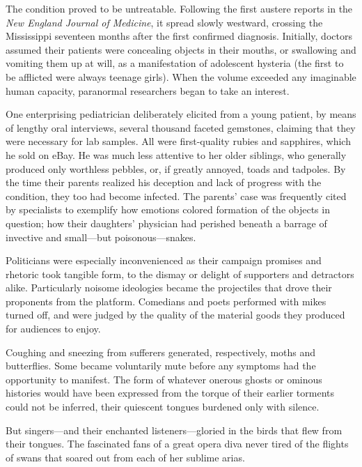 
The condition proved to be untreatable. Following the first austere
reports in the \emph{New England Journal of Medicine}, it spread slowly
westward, crossing the Mississippi seventeen months after the first
confirmed diagnosis. Initially, doctors assumed their patients were
concealing objects in their mouths, or swallowing and vomiting them up
at will, as a manifestation of adolescent hysteria (the first to be
afflicted were always teenage girls). When the volume exceeded any
imaginable human capacity, paranormal researchers began to take an
interest.

One enterprising pediatrician deliberately elicited from a young
patient, by means of lengthy oral interviews, several thousand faceted
gemstones, claiming that they were necessary for lab samples. All were
first-quality rubies and sapphires, which he sold on eBay. He was much
less attentive to her older siblings, who generally produced only
worthless pebbles, or, if greatly annoyed, toads and tadpoles. By the
time their parents realized his deception and lack of progress with the
condition, they too had become infected. The parents' case was
frequently cited by specialists to exemplify how emotions colored
formation of the objects in question; how their daughters' physician had
perished beneath a barrage of invective and small---but
poisonous---snakes.

Politicians were especially inconvenienced as their campaign promises
and rhetoric took tangible form, to the dismay or delight of supporters
and detractors alike. Particularly noisome ideologies became the
projectiles that drove their proponents from the platform. Comedians and
poets performed with mikes turned off, and were judged by the quality of
the material goods they produced for audiences to enjoy.

Coughing and sneezing from sufferers generated, respectively, moths and
butterflies. Some became voluntarily mute before any symptoms had the
opportunity to manifest. The form of whatever onerous ghosts or ominous
histories would have been expressed from the torque of their earlier
torments could not be inferred, their quiescent tongues burdened only
with silence.

But singers---and their enchanted listeners---gloried in the birds that
flew from their tongues. The fascinated fans of a great opera diva never
tired of the flights of swans that soared out from each of her sublime
arias.

